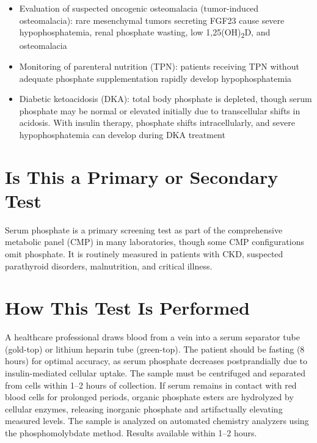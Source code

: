 \begin{itemize}
  \item Evaluation of suspected oncogenic osteomalacia (tumor-induced osteomalacia): rare mesenchymal tumors secreting FGF23 cause severe hypophosphatemia, renal phosphate wasting, low 1,25(OH)\textsubscript{2}D, and osteomalacia
  \item Monitoring of parenteral nutrition (TPN): patients receiving TPN without adequate phosphate supplementation rapidly develop hypophosphatemia
  \item Diabetic ketoacidosis (DKA): total body phosphate is depleted, though serum phosphate may be normal or elevated initially due to transcellular shifts in acidosis. With insulin therapy, phosphate shifts intracellularly, and severe hypophosphatemia can develop during DKA treatment
\end{itemize}

\section*{Is This a Primary or Secondary Test}
Serum phosphate is a primary screening test as part of the comprehensive metabolic panel (CMP) in many laboratories, though some CMP configurations omit phosphate. It is routinely measured in patients with CKD, suspected parathyroid disorders, malnutrition, and critical illness.

\section*{How This Test Is Performed}
A healthcare professional draws blood from a vein into a serum separator tube (gold-top) or lithium heparin tube (green-top). The patient should be fasting (8 hours) for optimal accuracy, as serum phosphate decreases postprandially due to insulin-mediated cellular uptake. The sample must be centrifuged and separated from cells within 1--2 hours of collection. If serum remains in contact with red blood cells for prolonged periods, organic phosphate esters are hydrolyzed by cellular enzymes, releasing inorganic phosphate and artifactually elevating measured levels. The sample is analyzed on automated chemistry analyzers using the phosphomolybdate method. Results available within 1--2 hours.

